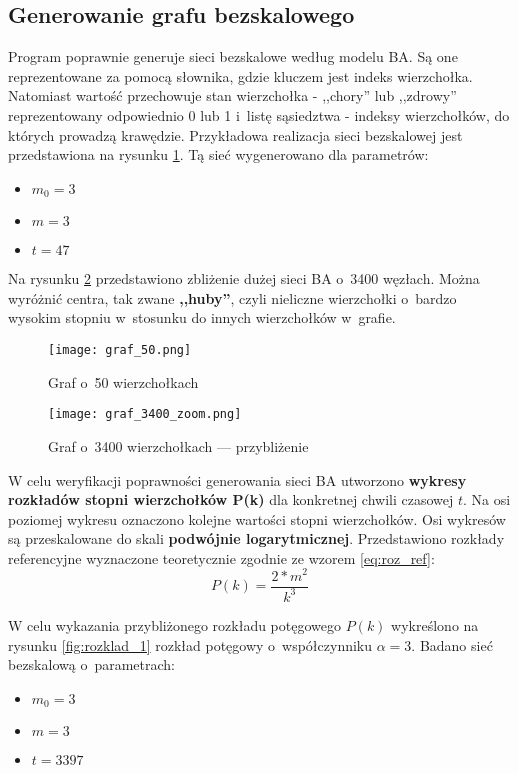 \begin{enumerate}
\subsection{Generowanie grafu bezskalowego}
\label{subsec:generowanie_grafu_bezskalwego}

Program poprawnie generuje sieci bezskalowe według modelu BA. Są one reprezentowane za pomocą słownika, gdzie kluczem jest indeks wierzchołka. Natomiast wartość przechowuje stan wierzchołka - ,,chory'' lub ,,zdrowy'' reprezentowany odpowiednio 0 lub 1 i~listę sąsiedztwa - indeksy wierzchołków, do których prowadzą krawędzie. Przykładowa realizacja sieci bezskalowej jest przedstawiona na rysunku \ref{fig:graf_50}. Tą sieć wygenerowano dla parametrów:
\begin{itemize}[nolistsep]
\item $m_0 = 3$
\item $m = 3$
\item $t = 47$
\end{itemize}
Na rysunku \ref{fig:graf_3400_zoom} przedstawiono zbliżenie dużej sieci BA o~3400 węzłach. Można wyróżnić centra, tak zwane \textbf{,,huby''}, czyli nieliczne wierzchołki o~bardzo wysokim stopniu w~stosunku do innych wierzchołków w~grafie.




\begin{figure}[H]
\centering
\texttt{[image: graf\_50.png]}
\caption{\small Graf o~50 wierzchołkach}
\label{fig:graf_50}
\end{figure}

\begin{figure}[H]
\centering
\texttt{[image: graf\_3400\_zoom.png]}
\caption{\small Graf o~3400 wierzchołkach --- przybliżenie}
\label{fig:graf_3400_zoom}
\end{figure}

W celu weryfikacji poprawności generowania sieci BA utworzono \textbf{wykresy rozkładów stopni wierzchołków P(k)} dla konkretnej chwili czasowej $t$. Na osi poziomej wykresu oznaczono kolejne wartości stopni wierzchołków. Osi wykresów są przeskalowane do skali \textbf{podwójnie logarytmicznej}. Przedstawiono rozkłady referencyjne wyznaczone teoretycznie zgodnie ze wzorem \ref{eq:roz_ref}:
\begin{equation}
\label{eq:roz_ref}
P(k) = \frac{2 * m^2}{k^3}
\end{equation}

W celu wykazania przybliżonego rozkładu potęgowego $P(k)$ wykreślono na rysunku \ref{fig:rozklad_1} rozkład potęgowy o~współczynniku $\alpha=3$. Badano sieć bezskalową o~parametrach:
\begin{itemize}[nolistsep]
\item $m_0 = 3$
\item $m = 3$
\item $t = 3397$
\end{itemize}


\end{enumerate}
